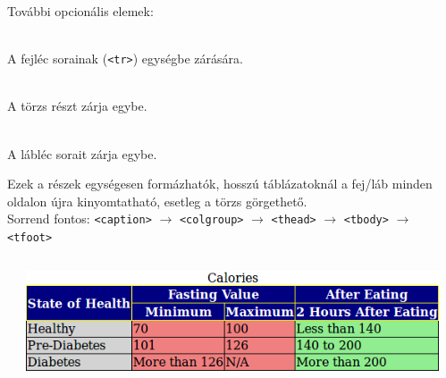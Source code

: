 \begin{frame}
  További opcionális elemek:
  \begin{description}[m]
    \item[\texttt{<thead>}] \hfill \\ A fejléc sorainak (\texttt{<tr>}) egységbe zárására.
    \item[\texttt{<tbody>}] \hfill \\ A törzs részt zárja egybe.
    \item[\texttt{<tfoot>}] \hfill \\ A lábléc sorait zárja egybe.
  \end{description}
  Ezek a részek egységesen formázhatók, hosszú táblázatoknál a fej/láb minden oldalon újra kinyomtatható, 
  esetleg a törzs görgethető.\\
  Sorrend fontos: \texttt{<caption>} $\to$ \texttt{<colgroup>} $\to$ \texttt{<thead>} $\to$ \texttt{<tbody>} $\to$ \texttt{<tfoot>}
\end{frame}

\begin{frame}
  \begin{columns}[c]
      \begin{exampleblock}{}
        \tiny
        
      \end{exampleblock}
      \centering \includegraphics[width=\textwidth]{tabla31.png}
      \begin{exampleblock}{}
        \tiny
        
      \end{exampleblock}
  \end{columns} 
\end{frame}

